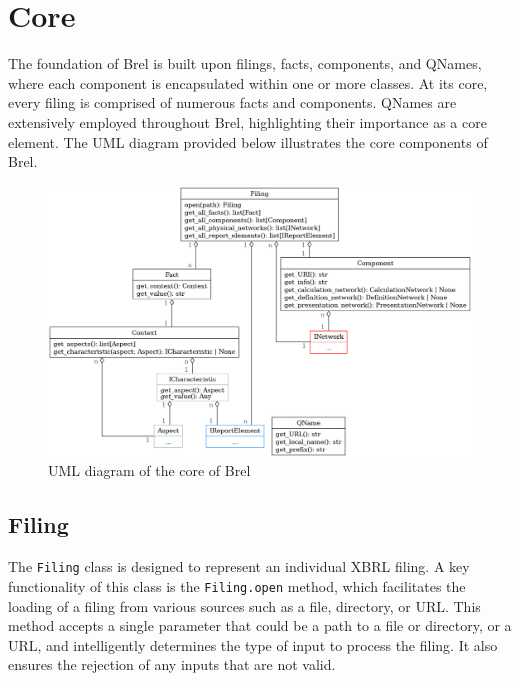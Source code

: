 \section{Core}

The foundation of Brel is built upon filings, facts, components, and QNames, where each component is encapsulated within one or more classes.
At its core, every filing is comprised of numerous facts and components.
QNames are extensively employed throughout Brel, highlighting their importance as a core element.
The UML diagram provided below illustrates the core components of Brel.

\begin{figure}[H]
    \centering
    \includegraphics[width=\textwidth]{images/brel_core_classes.png}
    \caption{UML diagram of the core of Brel}
    \label{fig:brel_core_classes}
\end{figure}

\subsection{Filing}
\label{subsec:filing}

The \texttt{Filing} class is designed to represent an individual XBRL filing.
A key functionality of this class is the \texttt{Filing.open} method, which facilitates the loading of a filing from various sources such as a file, directory, or URL.
This method accepts a single parameter that could be a path to a file or directory, or a URL, and intelligently determines the type of input to process the filing.
It also ensures the rejection of any inputs that are not valid.

